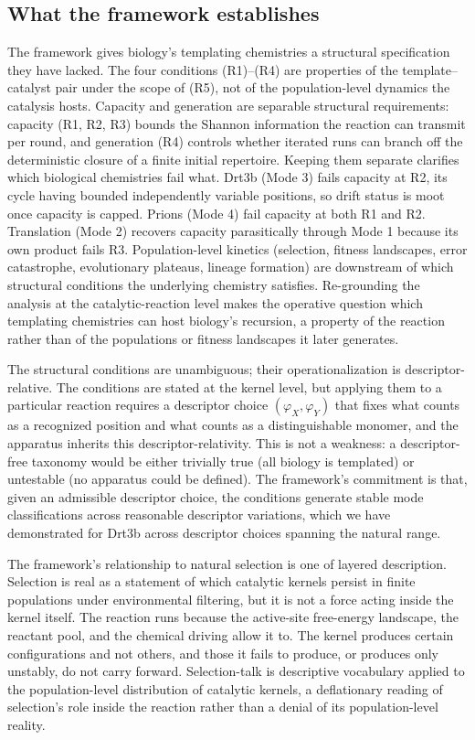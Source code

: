 \documentclass[aps,prx,reprint,amsmath,amssymb,floatfix,superscriptaddress,nofootinbib]{revtex4-2}
\theoremstyle{plain-thm}
\theoremstyle{definition-thm}
\newcommand{\descX}{\varphi_X}
\newcommand{\descY}{\varphi_Y}
\begin{document}
\subsection{What the framework establishes}

The framework gives biology's templating chemistries a structural specification they have lacked. The four conditions (R1)--(R4) are properties of the template--catalyst pair under the scope of (R5), not of the population-level dynamics the catalysis hosts. Capacity and generation are separable structural requirements: capacity (R1, R2, R3) bounds the Shannon information the reaction can transmit per round, and generation (R4) controls whether iterated runs can branch off the deterministic closure of a finite initial repertoire. Keeping them separate clarifies which biological chemistries fail what. Drt3b (Mode 3) fails capacity at R2, its cycle having bounded independently variable positions, so drift status is moot once capacity is capped. Prions (Mode 4) fail capacity at both R1 and R2. Translation (Mode 2) recovers capacity parasitically through Mode 1 because its own product fails R3. Population-level kinetics (selection, fitness landscapes, error catastrophe, evolutionary plateaus, lineage formation) are downstream of which structural conditions the underlying chemistry satisfies. Re-grounding the analysis at the catalytic-reaction level makes the operative question which templating chemistries can host biology's recursion, a property of the reaction rather than of the populations or fitness landscapes it later generates.

The structural conditions are unambiguous; their operationalization is descriptor-relative. The conditions are stated at the kernel level, but applying them to a particular reaction requires a descriptor choice $(\descX, \descY)$ that fixes what counts as a recognized position and what counts as a distinguishable monomer, and the apparatus inherits this descriptor-relativity. This is not a weakness: a descriptor-free taxonomy would be either trivially true (all biology is templated) or untestable (no apparatus could be defined). The framework's commitment is that, given an admissible descriptor choice, the conditions generate stable mode classifications across reasonable descriptor variations, which we have demonstrated for Drt3b across descriptor choices spanning the natural range.

The framework's relationship to natural selection is one of layered description. Selection is real as a statement of which catalytic kernels persist in finite populations under environmental filtering, but it is not a force acting inside the kernel itself. The reaction runs because the active-site free-energy landscape, the reactant pool, and the chemical driving allow it to. The kernel produces certain configurations and not others, and those it fails to produce, or produces only unstably, do not carry forward. Selection-talk is descriptive vocabulary applied to the population-level distribution of catalytic kernels, a deflationary reading of selection's role inside the reaction rather than a denial of its population-level reality.
\end{document}
